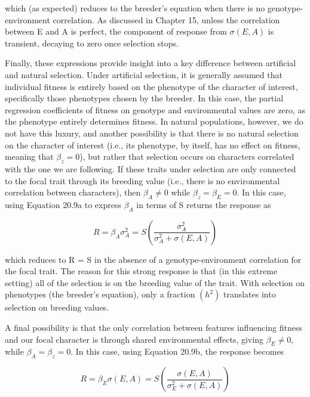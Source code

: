 \documentclass{article}
\begin{document}
which (as expected) reduces to the breeder's equation when there is no genotype-environment correlation. As discussed in Chapter 15, unless the correlation between E and A is perfect, the component of response from  $ \sigma(E, A) $ is transient, decaying to zero once selection stops.

Finally, these expressions provide insight into a key difference between artificial and natural selection. Under artificial selection, it is generally assumed that individual fitness is entirely based on the phenotype of the character of interest, specifically those phenotypes chosen by the breeder. In this case, the partial regression coefficients of fitness on genotype and environmental values are zero, as the phenotype entirely determines fitness. In natural populations, however, we do not have this luxury, and another possibility is that there is no natural selection on the character of interest (i.e., its phenotype, by itself, has no effect on fitness, meaning that  $ \beta_z = 0 $), but rather that selection occurs on characters correlated with the one we are following. If these traits under selection are only connected to the focal trait through its breeding value (i.e., there is no environmental correlation between characters), then  $ \beta_A \neq 0 $ while  $ \beta_z = \beta_E = 0 $. In this case, using Equation 20.9a to express  $ \beta_A $ in terms of S returns the response as

\begin{equation}
R=\beta_{A}\sigma_{A}^{2}=S\left(\frac{\sigma_{A}^{2}}{\sigma_{A}^{2}+\sigma(E,A)}\right)
\tag{20.15b}
\label{eq:20_15b}
\end{equation}

which reduces to R = S in the absence of a genotype-environment correlation for the focal trait. The reason for this strong response is that (in this extreme setting) all of the selection is on the breeding value of the trait. With selection on phenotypes (the breeder's equation), only a fraction  $ (h^{2}) $ translates into selection on breeding values.

A final possibility is that the only correlation between features influencing fitness and our focal character is through shared environmental effects, giving  $ \beta_E \neq 0 $, while  $ \beta_A = \beta_z = 0 $. In this case, using Equation 20.9b, the response becomes

\begin{equation}
R=\beta_{E}\sigma(E,A)=S\left(\frac{\sigma(E,A)}{\sigma_{E}^{2}+\sigma(E,A)}\right)
\tag{20.15c}
\label{eq:20_15c}
\end{equation}
\end{document}

